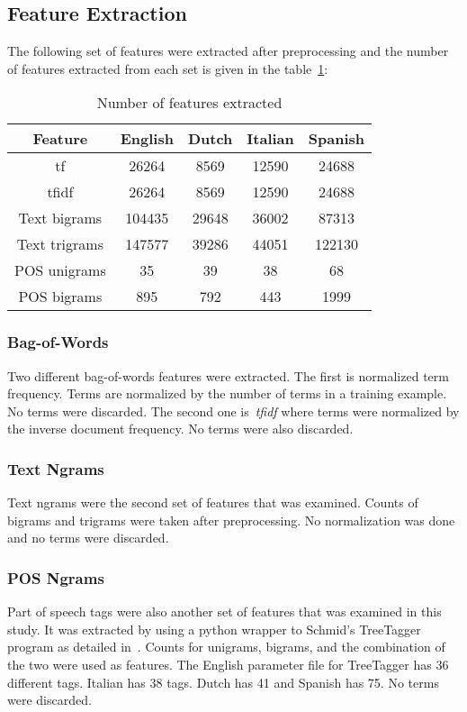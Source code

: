 \documentclass[a4paper]{llncs}
\begin{document}
\subsection{Feature Extraction}
The following set of features were extracted after preprocessing and the number of features extracted from each set is given in the table~\ref{table:numFeatures}: 

\begin{table}[!htbp]
\centering
\begin{tabular}{|c|cccc|}
\hline
Feature       & English & Dutch & Italian & Spanish \\ \hline
tf            & 26264   & 8569  & 12590   & 24688   \\ %
tfidf         & 26264   & 8569  & 12590   & 24688   \\ %
Text bigrams  & 104435  & 29648 & 36002   & 87313   \\ %
Text trigrams & 147577  & 39286 & 44051   & 122130  \\ %
POS unigrams  & 35      & 39    & 38      & 68      \\ %
POS bigrams   & 895     & 792   & 443     & 1999    \\ \hline
\end{tabular}
\caption{Number of features extracted}
\label{table:numFeatures}
\end{table}

\subsubsection{Bag-of-Words}

Two different bag-of-words features were extracted. The first is normalized term frequency. Terms are normalized by the number of terms in a training example. No terms were discarded. The second one is~\textit{tfidf} where terms were normalized by the inverse document frequency. No terms were also discarded. 

\subsubsection{Text Ngrams}
Text ngrams were the second set of features that was examined. Counts of bigrams and trigrams were taken after preprocessing. No normalization was done and no terms were discarded. 

\subsubsection{POS Ngrams}
Part of speech tags were also another set of features that was examined in this study. It was extracted by using a python wrapper to Schmid's TreeTagger program as detailed in~\cite{schmid1994probabilistic}. Counts for unigrams, bigrams, and the combination of the two were used as features. The English parameter file for TreeTagger has 36 different tags. Italian has 38 tags. Dutch has 41 and Spanish has 75. No terms were discarded.
\end{document}
